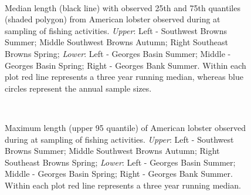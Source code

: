 \documentclass[11pt]{article}
\newcommand{\D}{.}
\newcommand{\e}{/backup/bio_data/bio.lobster/figures/} %
\begin{document}
\begin{landscape}
\begin{figure}

\\
                
    \caption{Median length (black line) with observed 25th and 75th quantiles (shaded polygon) from American lobster observed during at sampling of fishing activities. \emph{Upper}: Left - Southwest Browns Summer; Middle Southwest Browns Autumn; Right Southeast Browns Spring; \emph{Lower}: Left - Georges Basin Summer; Middle - Georges Basin Spring; Right - Georges Bank Summer. Within each plot red line represents a three year running median, whereas blue circles represent the annual sample sizes.}

\end{figure}




\begin{figure}

\\
                    
\caption{Maximum length (upper 95 quantile) of American lobster observed during at sampling of fishing activities. \emph{Upper}: Left - Southwest Browns Summer; Middle Southwest Browns Autumn; Right Southeast Browns Spring; \emph{Lower}: Left - Georges Basin Summer; Middle - Georges Basin Spring; Right - Georges Bank Summer. Within each plot red line represents a three year running median.}

\end{figure}
\end{landscape}
\end{document}
